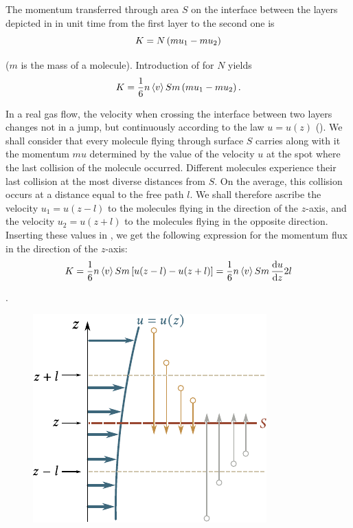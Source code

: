 The momentum transferred through area $S$ on the interface between the layers depicted in  in unit time from the first layer to the second one is
\begin{equation*}
    K = N \left(mu_1 - mu_2\right)
\end{equation*}

\noindent
($m$ is the mass of a molecule). Introduction of  for $N$
yields
\begin{equation}\label{eq:16_29}
    K = \frac{1}{6} n \left\langle v \right\rangle S m \left(mu_1 - mu_2\right).
\end{equation}

In a real gas flow, the velocity when crossing the interface between two layers changes not in a jump, but continuously according to the law $u=u(z)$ (). We shall consider that every molecule flying through surface $S$ carries along with it the momentum $mu$ determined by the value of the velocity $u$ at the spot where the last collision of
the molecule occurred. Different molecules experience their last collision at the most diverse distances from $S$. On the average, this collision occurs at a distance equal to the free path $l$. We shall therefore ascribe the velocity $u_1=u(z-l)$ to the molecules flying in the direction of the $z$-axis, and the velocity $u_2=u(z+l)$ to the molecules flying in the opposite direction. Inserting these values in , we get the following expression for the momentum flux in the direction of the $z$-axis:
\begin{equation*}
    K = \frac{1}{6} n \left\langle v \right\rangle S m \left[u(z-l)-u(z+l)\right] = \frac{1}{6} n \left\langle v \right\rangle S m\,\frac{\mathrm{d} u}{\mathrm{d} z} 2l
\end{equation*}

.

\begin{figure}[t]
	\begin{center}
		\includegraphics[scale=1]{figures/ch_16/fig_16_9.pdf}
		\caption[]{}
		\label{fig:16_9}
	\end{center}
	\vspace{-0.8cm}
\end{figure}


